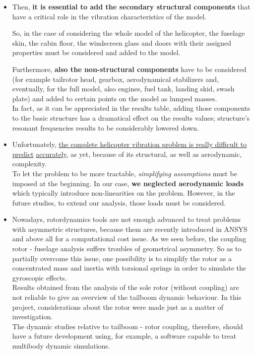 \begin{itemize}
	\item Then, \textbf{it is essential to add the secondary structural components} that have a critical role in the vibration characteristics of the model. 
	
	So, in the case of considering the whole model of the helicopter, the fuselage skin, the cabin floor, the windscreen glass and doors with their assigned properties must be considered and added to the model.

    Furthermore, \textbf{also the non-structural components} have to be considered (for example tailrotor head, gearbox, aerodynamical stabilizers and, eventually, for the full model, also engines, fuel tank, landing skid, swash plate) and added to certain points on the model as lumped masses. \\
    In fact, as it can be appreciated in the results table, adding those components to the basic structure has a dramatical effect on the results values; structure's resonant frequencies results to be considerably lowered down.  
    
    \item 
    Unfortunately, \underline{the complete helicopter vibration problem is really difficult	to predict} \underline{accurately}, as yet, because of its structural, as well as aerodynamic, complexity. \\
    To let the problem to be more tractable, \emph{simplifying assumptions} must be imposed at the beginning. In our case, \textbf{we neglected aerodynamic loads} which typically introduce non-linearities on the problem. However, in the future studies, to extend our analysis, those loads must be considered. 
    
    \item
    Nowadays, rotordynamics tools are not enough advanced to treat problems with asymmetric structures, because them are recently introduced in ANSYS and above all for a computational cost issue. As we seen before, the coupling rotor - fuselage analysis suffers troubles of geometrical asymmetry. So as to partially overcome this issue, one possibility is to simplify the rotor as a concentrated mass and inertia with torsional springs in order to simulate the gyroscopic effects. \\
    Results obtained from the analysis of the sole rotor (without coupling) are not reliable to give an overview of the tailboom dynamic behaviour. In this project, considerations about the rotor were made just as a matter of investigation.\\
    The dynamic studies relative to tailboom - rotor coupling, therefore, should have a future development using, for example, a software capable to treat multibody dynamic simulations.  
	
\end{itemize}


